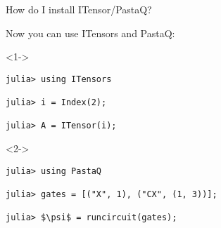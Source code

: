 \begin{frame}[fragile]{How do I install ITensor/PastaQ?}

Now you can use ITensors and PastaQ:

\begin{onlyenv}<1->
\begin{lstlisting}[language=JuliaLocal, mathescape, numbers=none, style=julia, basicstyle=\scriptsize\ttfamily]
julia> using ITensors

julia> i = Index(2);

julia> A = ITensor(i);
\end{lstlisting}
\end{onlyenv}

\begin{onlyenv}<2->
\begin{lstlisting}[language=JuliaLocal, mathescape, numbers=none, style=julia, basicstyle=\scriptsize\ttfamily]
julia> using PastaQ

julia> gates = [("X", 1), ("CX", (1, 3))];

julia> $\psi$ = runcircuit(gates);
\end{lstlisting}
\end{onlyenv}

\end{frame}
